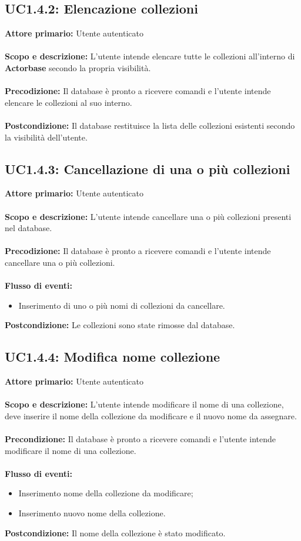 \documentclass{scalatekids-article}
\begin{document}
\subsection{UC1.4.2: Elencazione collezioni}
\textbf{Attore primario:} Utente autenticato\\ \\
\textbf{Scopo e descrizione:} L'utente intende elencare tutte le collezioni all'interno di \textbf{Actorbase} secondo la propria visibilità.\\ \\
\textbf{Precodizione:} Il database è pronto a ricevere comandi e l'utente intende elencare le collezioni al suo interno.\\ \\
\textbf{Postcondizione:} Il database restituisce la lista delle collezioni esistenti secondo la visibilità dell'utente.
\subsection{UC1.4.3: Cancellazione di una o più collezioni}
\textbf{Attore primario:} Utente autenticato\\ \\
\textbf{Scopo e descrizione:} L’utente intende cancellare una o più collezioni presenti nel database.\\ \\
\textbf{Precodizione:} Il database è pronto a ricevere comandi e l’utente intende cancellare una o più collezioni.\\ \\
\textbf{Flusso di eventi:}
\begin{itemize}
\item Inserimento di uno o più nomi di collezioni da cancellare.
\end{itemize}
\textbf{Postcondizione:} Le collezioni sono state rimosse dal database.
\subsection{UC1.4.4: Modifica nome collezione}
\textbf{Attore primario:} Utente autenticato \\ \\
\textbf{Scopo e descrizione:} L’utente intende modificare il nome di una collezione, deve inserire il nome della collezione da modificare e il nuovo nome da assegnare. \\ \\
\textbf{Precondizione:} Il database è pronto a ricevere comandi e l’utente intende modificare il nome di una collezione.\\ \\
\textbf{Flusso di eventi:}
\begin{itemize}
\item Inserimento nome della collezione da modificare;
\item Inserimento nuovo nome della collezione.
\end{itemize}
\textbf{Postcondizione:} Il nome della collezione è stato modificato.
\end{document}
